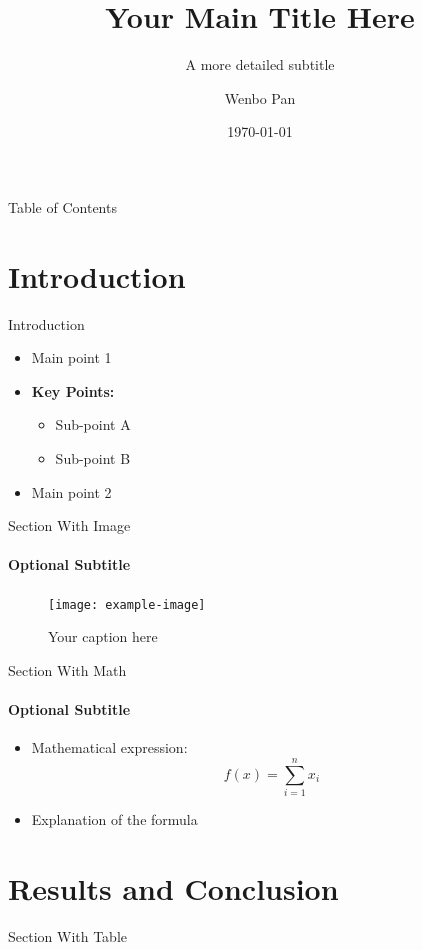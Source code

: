 \documentclass[aspectratio=169,12pt]{beamer}
\title{Your Main Title Here}
\subtitle{A more detailed subtitle}
\author{Wenbo Pan}
\date{\today}
\begin{document}
\begin{frame}
    \titlepage
\end{frame}

\begin{frame}{Table of Contents}
    \tableofcontents
\end{frame}

\section{Introduction}
\begin{frame}{Introduction}
    \begin{itemize}
        \item Main point 1
        \item \textbf{Key Points:} 
        \begin{itemize}
            \item Sub-point A
            \item Sub-point B
        \end{itemize}
        \item Main point 2
    \end{itemize}
\end{frame}

\begin{frame}{Section With Image}
    \framesubtitle{Optional Subtitle}
    \begin{figure}
        \texttt{[image: example-image]}
        \caption{Your caption here}
    \end{figure}
\end{frame}

\begin{frame}{Section With Math}
    \framesubtitle{Optional Subtitle}
    \begin{itemize}
        \item Mathematical expression:
            \[
            f(x) = \sum_{i=1}^{n} x_i
            \]
        \item Explanation of the formula
    \end{itemize}
\end{frame}

\section{Results and Conclusion}
\begin{frame}{Section With Table}
    \begin{table}
        \caption{Your table caption here}
    \end{table}
\end{frame}
\end{document}
